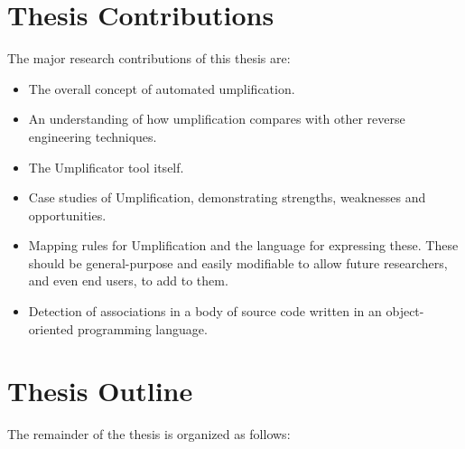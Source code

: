 \section{Thesis Contributions}

The major research contributions of this thesis are:

\begin{itemize}
\item The overall concept of automated umplification.

\item An understanding of how umplification compares with other reverse engineering techniques.

\item The Umplificator tool itself.

\item Case studies of Umplification, demonstrating strengths, weaknesses and opportunities.

\item Mapping rules for Umplification and the language for expressing these. These should be general-purpose and easily modifiable to allow future researchers, and even end users, to add to them.

\item Detection of associations in a body of source code written in an object-oriented programming language. 
\end{itemize}


\section{Thesis Outline}

The remainder of the thesis is organized as follows:

